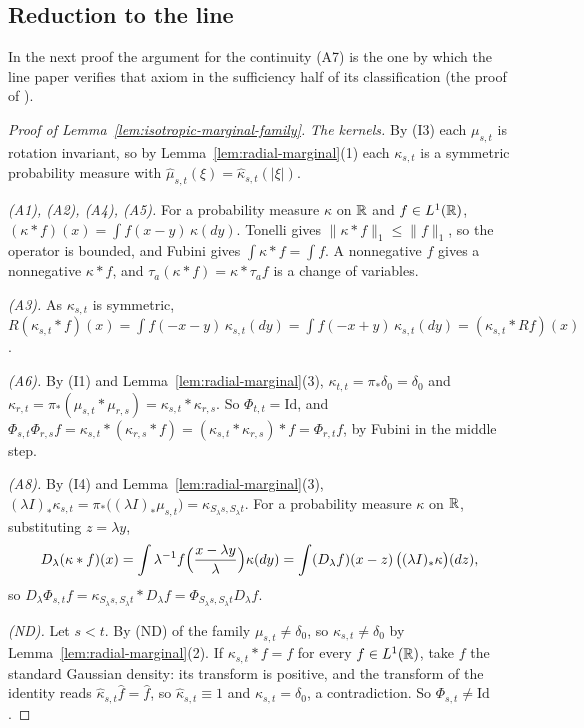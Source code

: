 \subsection{Reduction to the line}\label{supp:proofs-reduction}

In the next proof the argument for the continuity (A7) is the one by which the line paper
verifies that axiom in the sufficiency half of its classification (the proof of
).

\begin{proof}[Proof of Lemma~\ref{lem:isotropic-marginal-family}]
\emph{The kernels.} By (I3) each $\mu_{s,t}$ is rotation invariant, so by
Lemma~\ref{lem:radial-marginal}(1) each $\kappa_{s,t}$ is a symmetric probability measure with
$\widehat\mu_{s,t}(\xi) = \widehat\kappa_{s,t}(|\xi|)$.

\emph{(A1), (A2), (A4), (A5).} For a probability measure $\kappa$ on $\mathbb{R}$ and $f \in L^1(\mathbb{R})$,
$(\kappa * f)(x) = \int f(x-y)\,\kappa(dy)$. Tonelli gives $\|\kappa * f\|_1 \le \|f\|_1$, so the
operator is bounded, and Fubini gives $\int \kappa * f = \int f$. A nonnegative $f$ gives a
nonnegative $\kappa * f$, and $\tau_a(\kappa * f) = \kappa * \tau_af$ is a change of variables.

\emph{(A3).} As $\kappa_{s,t}$ is symmetric, $R(\kappa_{s,t} * f)(x) = \int f(-x-y)\,\kappa_{s,t}(dy)
= \int f(-x+y)\,\kappa_{s,t}(dy) = (\kappa_{s,t} * Rf)(x)$.

\emph{(A6).} By (I1) and Lemma~\ref{lem:radial-marginal}(3), $\kappa_{t,t} = \pi_*\delta_0 = \delta_0$
and $\kappa_{r,t} = \pi_*(\mu_{s,t} * \mu_{r,s}) = \kappa_{s,t} * \kappa_{r,s}$. So
$\Phi_{t,t} = \mathrm{Id}$, and $\Phi_{s,t}\Phi_{r,s}f = \kappa_{s,t} * (\kappa_{r,s} * f)
= (\kappa_{s,t} * \kappa_{r,s}) * f = \Phi_{r,t}f$, by Fubini in the middle step.

\emph{(A8).} By (I4) and Lemma~\ref{lem:radial-marginal}(3),
$(\lambda I)_*\kappa_{s,t} = \pi_*\bigl((\lambda I)_*\mu_{s,t}\bigr) = \kappa_{S_\lambda s,S_\lambda t}$.
For a probability measure $\kappa$ on $\mathbb{R}$, substituting $z = \lambda y$,
\[
  D_\lambda(\kappa * f)(x) = \int \lambda^{-1}f\Bigl(\frac{x - \lambda y}{\lambda}\Bigr)\kappa(dy)
   = \int (D_\lambda f)(x - z)\,\bigl((\lambda I)_*\kappa\bigr)(dz) ,
\]
so $D_\lambda\Phi_{s,t}f = \kappa_{S_\lambda s,S_\lambda t} * D_\lambda f
= \Phi_{S_\lambda s,S_\lambda t}D_\lambda f$.

\emph{(ND).} Let $s < t$. By (ND) of the family $\mu_{s,t} \ne \delta_0$, so
$\kappa_{s,t} \ne \delta_0$ by Lemma~\ref{lem:radial-marginal}(2). If $\kappa_{s,t} * f = f$ for every
$f \in L^1(\mathbb{R})$, take $f$ the standard Gaussian density: its transform is positive, and the
transform of the identity reads $\widehat\kappa_{s,t}\widehat f = \widehat f$, so
$\widehat\kappa_{s,t} \equiv 1$ and $\kappa_{s,t} = \delta_0$, a contradiction. So
$\Phi_{s,t} \ne \mathrm{Id}$.


\end{proof}
